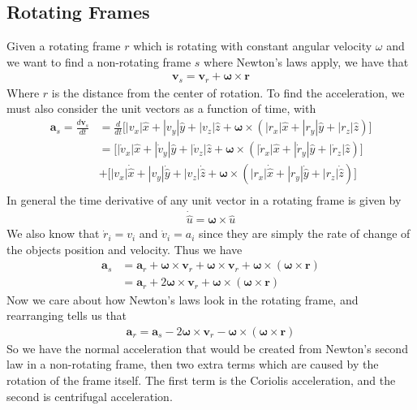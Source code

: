 \subsection{Rotating Frames}
Given a rotating frame $r$ which is rotating with constant angular velocity $\omega$ and we want to find a non-rotating frame $s$ where Newton's laws apply, we have that
\begin{align}
\textbf{v}_s = \textbf{v}_r + \boldsymbol{\omega}\times\textbf{r}
\end{align}
Where $r$ is the distance from the center of rotation. To find the acceleration, we must also consider the unit vectors as a function of time, with %
\begin{align}
\textbf{a}_s = \frac{d\textbf{v}_s}{dt} &= \frac{d}{dt}\Big[|v_x|\hat{x} + |v_y|\hat{y} + |v_z|\hat{z} + \boldsymbol{\omega}\times(|r_x|\hat{x} + |r_y|\hat{y} + |r_z|\hat{z})\Big]\\
&= \Big[|\dot{v}_x|\hat{x} + |\dot{v}_y|\hat{y} + |\dot{v}_z|\hat{z} + \boldsymbol{\omega}\times(|\dot{r}_x|\hat{x} + |\dot{r}_y|\hat{y} + |\dot{r}_z|\hat{z})\Big] \\
&+ \Big[|v_x|\dot{\hat{x}} + |v_y|\dot{\hat{y}} + |v_z|\dot{\hat{z}}  +\boldsymbol{\omega}\times(|r_x|\dot{\hat{x}} + |r_y|\dot{\hat{y}} + |r_z|\dot{\hat{z}})\Big]\\
\end{align}
In general the time derivative of any unit vector in a rotating frame is given by
\begin{align}
\dot{\hat{u}} = \boldsymbol{\omega}\times\hat{u}
\end{align}
We also know that $\dot{r}_i = v_i$ and $\dot{v}_i = a_i$ since they are simply the rate of change of the objects position and velocity. Thus we have
\begin{align}
\textbf{a}_s &= \textbf{a}_r + \boldsymbol{\omega}\times\textbf{v}_r + \boldsymbol{\omega}\times\textbf{v}_r + \boldsymbol{\omega}\times(\boldsymbol{\omega}\times\textbf{r})\\
&= \textbf{a}_r + 2\boldsymbol{\omega}\times\textbf{v}_r + \boldsymbol{\omega}\times(\boldsymbol{\omega}\times\textbf{r})
\end{align}
Now we care about how Newton's laws look in the rotating frame, and rearranging tells us that
\begin{align}
\textbf{a}_r = \textbf{a}_s - 2\boldsymbol{\omega}\times\textbf{v}_r - \boldsymbol{\omega}\times(\boldsymbol{\omega}\times\textbf{r})
\end{align}
So we have the normal acceleration that would be created from Newton's second law in a non-rotating frame, then two extra terms which are caused by the rotation of the frame itself. The first term is the Coriolis acceleration, and the second is centrifugal acceleration.


